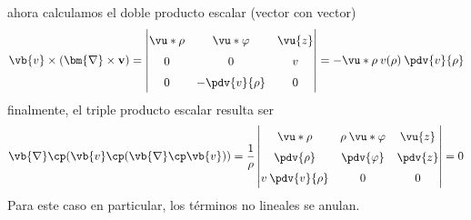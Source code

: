 ahora calculamos el doble producto escalar (vector con vector)
\begin{align*}
\vb{v} \times (\bm{\nabla} \times \mathbf{v}) = \left| 
\renewcommand\arraystretch{1.5} \begin{matrix}
\vu*{\rho} & \vu*{\varphi} & \vu{z} \\
0 & 0 & v \\
0 & - \displaystyle \pdv{v}{\rho} & 0 \end{matrix} \right| = - \vu*{\rho} \: v(\rho) \: \pdv{v}{\rho}
\end{align*} 
finalmente, el triple producto escalar resulta ser
\begin{align*}
\vb{\nabla} \cp ( \vb{v} \cp (\vb{\nabla} \cp \vb{v})) = \dfrac{1}{\rho} \left| 
\renewcommand\arraystretch{1.5} \begin{matrix}
\vu*{\rho} & \rho \: \vu*{\varphi} & \vu{z} \\
\displaystyle \pdv{\rho} & \displaystyle \pdv{\varphi} & \displaystyle \pdv{z} \\
v \: \displaystyle \pdv{v}{\rho} & 0 & 0 \end{matrix} \right| = 0
\end{align*}
Para este caso en particular, los términos no lineales se anulan. 
